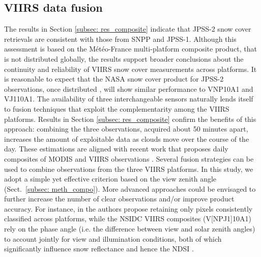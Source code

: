 \documentclass[tc, manuscript]{copernicus}
\begin{document}
\subsection{VIIRS data fusion}
\label{subsec: disc_multiplatform}

The results in Section \ref{subsec: res_composite} indicate that JPSS-2 snow cover retrievals are consistent with those from SNPP and JPSS-1. Although this assessment is based on the Météo-France multi-platform composite product, that is not distributed globally, the results support broader conclusions about the continuity and reliability of VIIRS snow cover measurements across platforms. It is reasonable to expect that the NASA snow cover product for JPSS-2 observations, once distributed \citep{riggs2023viirs}, will show similar performance to VNP10A1 and VJ110A1. The availability of three interchangeable sensors naturally lends itself to fusion techniques that exploit the complementarity among the VIIRS platforms.  
Results in Section \ref{subsec: res_composite} confirm the benefits of this approach: combining the three observations, acquired about 50 minutes apart, increases the amount of exploitable data as clouds move over the course of the day. These estimations are aligned with recent work that proposes daily composites of MODIS and VIIRS observations  \citep{dietz_brief_2025}.  Several fusion strategies can be used to combine observations from the three VIIRS platforms. In this study, we adopt a simple yet effective criterion based on the view zenith angle (Sect.~\ref{subsec: meth_compo}). More advanced approaches could be envisaged to further increase the number of clear observations and/or improve product accuracy. For instance, in  the authors propose retaining only pixels consistently classified across platforms, while the NSIDC VIIRS composites (V[NP\textbar J1]10A1) rely on the phase angle (i.e. the difference between view and solar zenith angles) to account jointly for view and illumination conditions, both of which significantly influence snow reflectance and hence the NDSI \citep{ji2022NewIndexSnow}. 

\conclusions  %
\label{sec: conclusion}
\end{document}
